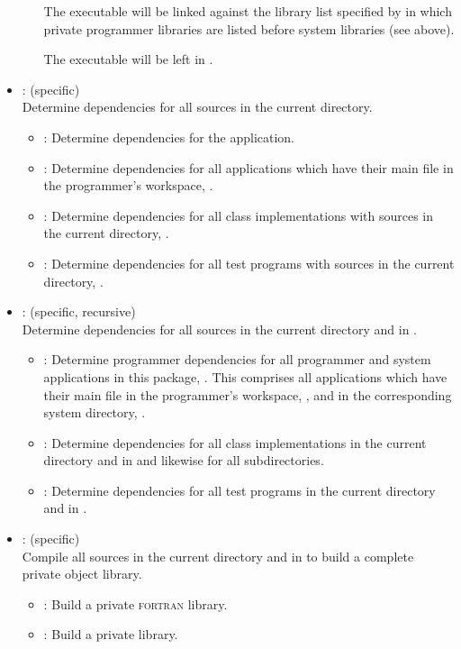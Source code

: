 \begin{itemize}
\begin{itemize}
      The executable will be linked against the library list specified by
       in which private programmer libraries are listed
      before system libraries (see above).

      The executable will be left in .
   \end{itemize}

\item
    : (specific)
   \\ Determine dependencies for all sources in the current directory.
   \begin{itemize}
   \item
      : Determine dependencies for the application.
   \item
      : Determine dependencies for all applications which have their
      main  file in the programmer's workspace, .
   \item
      : Determine dependencies for all class implementations with
      sources in the current directory, .
   \item
      : Determine dependencies for all test programs with sources in
      the current directory, .
   \end{itemize}

\item
    : (specific, recursive)
   \\ Determine dependencies for all sources in the current directory and in
   .
   \begin{itemize}
   \item
      : Determine programmer dependencies for all programmer and
      system applications in this package, .  This comprises
      all applications which have their main  file in the
      programmer's workspace, , and in the corresponding
      system directory, .
   \item
      : Determine dependencies for all class implementations in the
      current directory and in  and likewise for all
      subdirectories.
   \item
      : Determine dependencies for all test programs in the current
      directory and in .
   \end{itemize}

\item
    : (specific)
   \\ Compile all sources in the current directory and in  to
   build a complete private object library.
   \begin{itemize}
   \item
      : Build a private \textsc{fortran} library.
   \item
      : Build a private  library.
   \end{itemize}


\end{itemize}
